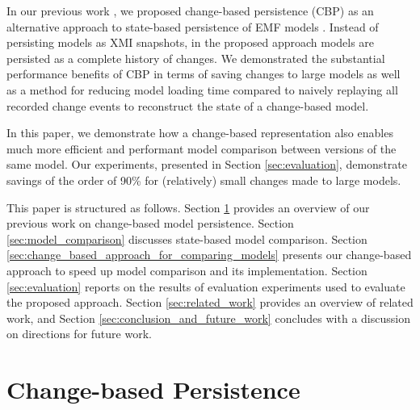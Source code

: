 \documentclass{jot}
\newcommand{\dk}[1]{\textcolor{blue}{\textbf{[Dimitris: #1]}}}
\begin{document}
In our previous work \cite{DBLP:conf/models/YohannisKP17,yohannis2018towards,DBLP:conf/models/YohannisRPK18}, we proposed change-based persistence (CBP) as an alternative approach to state-based persistence of EMF models \cite{steinberg2008emf}. Instead of persisting models as XMI snapshots, in the proposed approach models are persisted as a complete history of changes. We demonstrated the substantial performance benefits of CBP in terms of saving changes to large models \cite{DBLP:conf/models/YohannisKP17} as well as a method for reducing model loading time compared to naively replaying all recorded change events \cite{DBLP:conf/models/YohannisRPK18} to reconstruct the state of a change-based model.

In this paper, we demonstrate how a change-based representation also enables much more efficient and performant model comparison between versions of the same model. Our experiments, presented in Section \ref{sec:evaluation}, demonstrate savings of the order of 90\% for (relatively) small changes made to large models.

This paper is structured as follows. Section \ref{sec:change-based_persistence} provides an overview of our previous work on change-based model persistence. Section \ref{sec:model_comparison} discusses state-based model comparison. Section \ref{sec:change_based_approach_for_comparing_models} presents our change-based approach to speed up model comparison and its implementation. Section \ref{sec:evaluation} 
reports on the results of evaluation experiments used to evaluate the proposed approach. Section \ref{sec:related_work} provides an overview of related work, and Section \ref{sec:conclusion_and_future_work} concludes with a discussion on directions for future work.

\vspace{-10pt}
\section{Change-based Persistence}
\label{sec:change-based_persistence}
\end{document}
